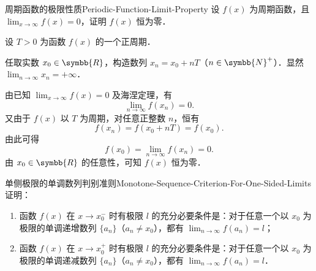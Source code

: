 \begin{problem}{周期函数的极限性质}{Periodic-Function-Limit-Property}
    设 $f(x)$ 为周期函数，且 $\lim_{x\to\infty} f(x) = 0$，证明 $f(x)$ 恒为零．
\end{problem}

\begin{myproof}
    设 $T > 0$ 为函数 $f(x)$ 的一个正周期．

    任取实数 $x_0 \in \symbb{R}$，构造数列 $x_n = x_0 + nT$（$n \in \symbb{N}^+$）．显然 $\lim_{n\to\infty} x_n = +\infty$．

    由已知 $\lim_{x\to\infty} f(x) = 0$ 及海涅定理，有
    \begin{equation}
        \lim_{n\to\infty} f(x_n) = 0.
    \end{equation}
    又由于 $f(x)$ 以 $T$ 为周期，对任意正整数 $n$，恒有
    \begin{equation}
        f(x_n) = f(x_0 + nT) = f(x_0).
    \end{equation}
    由此可得
    \begin{equation}
        f(x_0) = \lim_{n\to\infty} f(x_n) = 0.
    \end{equation}
    由 $x_0 \in \symbb{R}$ 的任意性，可知 $f(x)$ 恒为零．
\end{myproof}

\begin{problem}{单侧极限的单调数列判别准则}{Monotone-Sequence-Criterion-For-One-Sided-Limits}
    证明：
    \begin{enumerate}
        \item 函数 $f(x)$ 在 $x \to x_0^-$ 时有极限 $l$ 的充分必要条件是：对于任意一个以 $x_0$ 为极限的单调递增数列 $\{a_n\}$（$a_n \neq x_0$），都有 $\lim_{n\to\infty} f(a_n) = l$；
        \item 函数 $f(x)$ 在 $x \to x_0^+$ 时有极限 $l$ 的充分必要条件是：对于任意一个以 $x_0$ 为极限的单调递减数列 $\{a_n\}$（$a_n \neq x_0$），都有 $\lim_{n\to\infty} f(a_n) = l$．
    \end{enumerate}
\end{problem}

